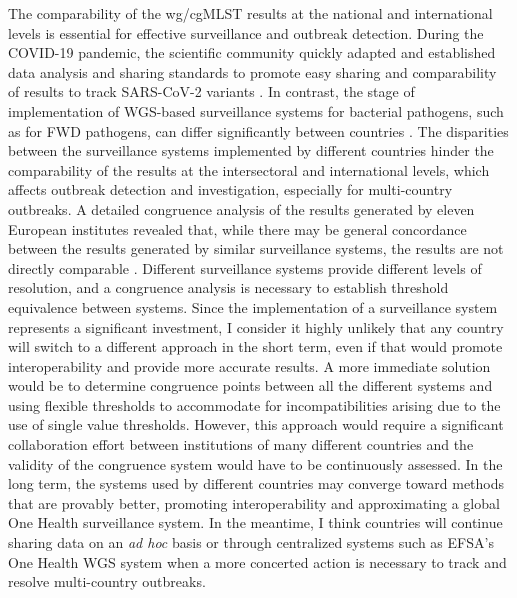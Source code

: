 The comparability of the \ac{wg/cgMLST} results at the national and international levels is essential for effective surveillance and outbreak detection. During the COVID-19 pandemic, the scientific community quickly adapted and established data analysis and sharing standards to promote easy sharing and comparability of results to track SARS-CoV-2 variants \cite{maxwell_fair_2023, griffiths_future-proofing_2022}. In contrast, the stage of implementation of \ac{WGS}-based surveillance systems for bacterial pathogens, such as for \ac{FWD} pathogens, can differ significantly between countries \cite{mixao_multi-country_2025}. The disparities between the surveillance systems implemented by different countries hinder the comparability of the results at the intersectoral and international levels, which affects outbreak detection and investigation, especially for multi-country outbreaks. A detailed congruence analysis of the results generated by eleven European institutes revealed that, while there may be general concordance between the results generated by similar surveillance systems, the results are not directly comparable \cite{mixao_multi-country_2025}. Different surveillance systems provide different levels of resolution, and a congruence analysis is necessary to establish threshold equivalence between systems. Since the implementation of a surveillance system represents a significant investment, I consider it highly unlikely that any country will switch to a different approach in the short term, even if that would promote interoperability and provide more accurate results. A more immediate solution would be to determine congruence points between all the different systems and using flexible thresholds to accommodate for incompatibilities arising due to the use of single value thresholds. However, this approach would require a significant collaboration effort between institutions of many different countries and the validity of the congruence system would have to be continuously assessed. In the long term, the systems used by different countries may converge toward methods that are provably better, promoting interoperability and approximating a global One Health surveillance system. In the meantime, I think countries will continue sharing data on an \textit{ad hoc} basis or through centralized systems such as \ac{EFSA}'s One Health WGS system when a more concerted action is necessary to track and resolve multi-country outbreaks.

